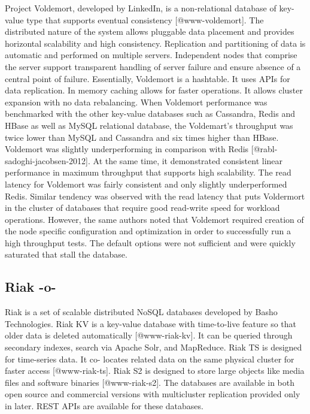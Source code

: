 Project Voldemort, developed by LinkedIn, is a non-relational database
of key-value type that supports eventual
consistency [@www-voldemort].  The distributed nature of the
system allows pluggable data placement and provides horizontal
scalability and high consistency. Replication and partitioning of data
is automatic and performed on multiple servers. Independent nodes that
comprise the server support transparent handling of server failure and
ensure absence of a central point of failure. Essentially, Voldemort
is a hashtable. It uses APIs for data replication. In memory caching
allows for faster operations. It allows cluster expansion with no data
rebalancing.  When Voldemort performance was benchmarked with the
other key-value databases such as Cassandra, Redis and HBase as well
as MySQL relational database, the Voldemart's throughput was twice
lower than MySQL and Cassandra and six times higher than
HBase. Voldemort was slightly underperforming in comparison with
Redis [@rabl-sadoghi-jacobsen-2012].  At the same time, it
demonstrated consistent linear performance in maximum throughput that
supports high scalability. The read latency for Voldemort was fairly
consistent and only slightly underperformed Redis. Similar tendency
was observed with the read latency that puts Voldermort in the cluster
of databases that require good read-write speed for workload
operations. However, the same authors noted that Voldemort required
creation of the node specific configuration and optimization in order
to successfully run a high throughput tests. The default options were
not sufficient and were quickly saturated that stall the database.


     
\subsection{Riak -o-}

Riak is a set of scalable distributed NoSQL databases developed by
Basho Technologies. Riak KV is a key-value database with time-to-live
feature so that older data is deleted
automatically [@www-riak-kv].  It can be queried through secondary
indexes, search via Apache Solr, and MapReduce. Riak TS is designed
for time-series data. It co- locates related data on the same physical
cluster for faster access [@www-riak-ts]. Riak S2 is designed to
store large objects like media files and software
binaries [@www-riak-s2]. The databases are available in both open
source and commercial versions with multicluster replication provided
only in later. REST APIs are available for these databases.



